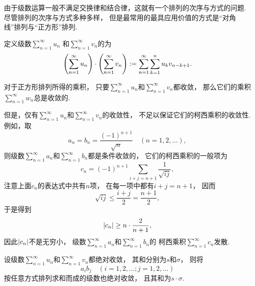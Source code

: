 由于级数运算一般不满足交换律和结合律，这就有一个排列的次序与方式的问题.
尽管排列的次序与方式多种多样，
但是最常用的最具应用价值的方式是“对角线”排列与“正方形”排列.

\begin{definition}\label{definition:无穷级数.绝对收敛级数的柯西乘积}
定义级数\(\sum_{n=1}^\infty u_n\)
和\(\sum_{n=1}^\infty v_n\)的为\[
	\left( \sum_{n=1}^\infty u_n \right)
	\cdot
	\left( \sum_{n=1}^\infty v_n \right)
	:=
	\sum_{n=1}^\infty \sum_{k=1}^n u_k v_{n-k+1}.
\]
\end{definition}

对于正方形排列所得的乘积，
只要\(\sum_{n=1}^\infty u_n\)和\(\sum_{n=1}^\infty v_n\)都收敛，
那么它们的乘积\(\sum_{n=1}^\infty w_n\)总是收敛的.

但是，仅有\(\sum_{n=1}^\infty u_n\)和\(\sum_{n=1}^\infty v_n\)的收敛性，
不足以保证它们的柯西乘积的收敛性.
例如，取\[
	a_n = b_n = \frac{(-1)^{n+1}}{\sqrt{n}}
	\quad(n=1,2,\dotsc),
\]
则级数\(\sum_{n=1}^\infty a_n\)和\(\sum_{n=1}^\infty b_n\)都是条件收敛的，
它们的柯西乘积的一般项为\[
	c_n = (-1)^{n+1} \sum_{i+j=n+1} \frac1{\sqrt{ij}},
\]
注意上面\(c_n\)的表达式中共有\(n\)项，
在每一项中都有\(i+j = n+1\)，
因而\[
	\sqrt{ij} \leq \frac{i+j}2 = \frac{n+1}2,
\]
于是得到\[
	\abs{c_n} \geq n \cdot \frac2{n+1},
\]
因此\(\abs{c_n}\)不是无穷小，
级数\(\sum_{n=1}^\infty a_n\)和\(\sum_{n=1}^\infty b_n\)的
柯西乘积\(\sum_{n=1}^\infty c_n\)发散.

\begin{theorem}\label{theorem:无穷级数.绝对收敛级数的柯西乘积必收敛}
设级数\(\sum_{n=1}^\infty u_n\)和\(\sum_{n=1}^\infty v_n\)都绝对收敛，
其和分别为\(s\)和\(\sigma\)，
则将\[
	a_i b_j
	\quad(i=1,2,\dotsc;j=1,2,\dotsc)
\]按任意方式排列求和而成的级数也绝对收敛，
且其和为\(s \cdot \sigma\).
\end{theorem}

